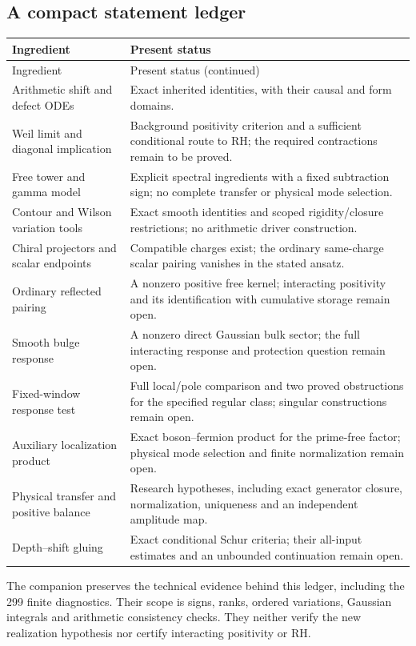 \subsection{A compact statement ledger}

\renewcommand{\arraystretch}{1.13}
\begin{longtable}{@{}p{}p{}@{}}
\toprule
Ingredient & Present status\\
\midrule
\endfirsthead
\toprule
Ingredient & Present status (continued)\\
\midrule
\endhead
\bottomrule
\endfoot
Arithmetic shift and defect ODEs &
Exact inherited identities, with their causal and form domains.\\
Weil limit and diagonal implication &
Background positivity criterion and a sufficient conditional route
to RH; the required contractions remain to be proved.\\
Free tower and gamma model &
Explicit spectral ingredients with a fixed subtraction sign;
no complete transfer or physical mode selection.\\
Contour and Wilson variation tools &
Exact smooth identities and scoped rigidity/closure restrictions;
no arithmetic driver construction.\\
Chiral projectors and scalar endpoints &
Compatible charges exist; the ordinary same-charge scalar
pairing vanishes in the stated ansatz.\\
Ordinary reflected pairing &
A nonzero positive free kernel; interacting positivity and its
identification with cumulative storage remain open.\\
Smooth bulge response &
A nonzero direct Gaussian bulk sector; the full interacting
response and protection question remain open.\\
Fixed-window response test &
Full local/pole comparison and two proved obstructions for the
specified regular class; singular constructions remain open.\\
Auxiliary localization product &
Exact boson--fermion product for the prime-free factor;
physical mode selection and finite normalization remain open.\\
Physical transfer and positive balance &
Research hypotheses, including exact generator closure,
normalization, uniqueness and an independent amplitude map.\\
Depth--shift gluing &
Exact conditional Schur criteria; their all-input estimates
and an unbounded continuation remain open.\\
\end{longtable}
\renewcommand{\arraystretch}{1}

The companion preserves the technical evidence behind this ledger,
including the 299 finite diagnostics. Their scope is signs, ranks,
ordered variations, Gaussian integrals and arithmetic consistency checks. They neither verify the
new realization hypothesis nor certify interacting positivity or RH.
